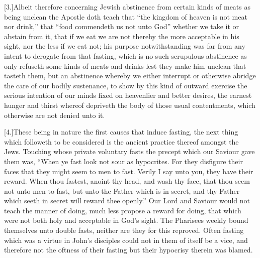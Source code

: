 [3.]Albeit therefore concerning Jewish abstinence from certain kinds of meats as being unclean the Apostle doth teach that “the kingdom of heaven is not meat nor drink,” that “food commendeth us not unto God” whether we take it or abstain from it, that if we eat we are not thereby the more acceptable in his sight, nor the less if we eat not; his purpose notwithstanding was far from any intent to derogate from that fasting, which is no such scrupulous abstinence as only refuseth some kinds of meats and drinks lest they make him unclean that tasteth them, but an abstinence whereby we either interrupt or otherwise abridge the care of our bodily sustenance, to show by this kind of outward exercise the serious intention of our minds fixed on heavenlier and better desires, the earnest hunger and thirst whereof depriveth the body of those usual contentments, which otherwise are not denied unto it.

[4.]These being in nature the first causes that induce fasting, the next thing which followeth to be considered is the ancient practice thereof amongst the Jews. Touching whose private voluntary fasts the precept which our Saviour gave them was, “When ye fast look not sour as hypocrites.  For they disfigure their faces that they might seem to men to fast.
 Verily I say unto you, they have their reward. When thou fastest, anoint thy head, and wash thy face, that thou seem not unto men to fast, but unto the Father which is in secret, and thy Father which seeth in secret will reward thee openly.” Our Lord and Saviour would not teach the manner of doing, much less propose a reward for doing, that which were not both holy and acceptable in God’s sight. The Pharisees weekly bound themselves unto double fasts, neither are they for this reproved. Often fasting which was a virtue in John’s disciples could not in them of itself be a vice, and therefore not the oftness of their fasting but their hypocrisy therein was blamed.

